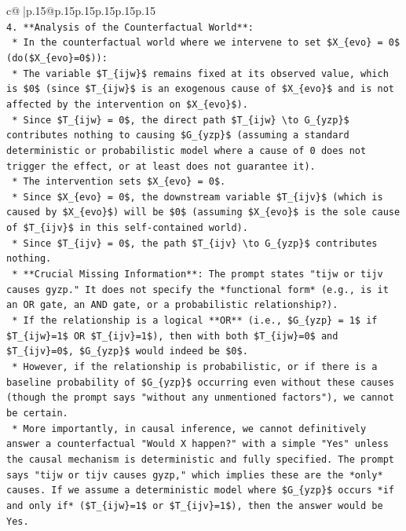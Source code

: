\documentclass{article}
\begin{document}
{\begin{supertabular}{c@{$\;$}|p{.15\linewidth}@{}p{.15\linewidth}p{.15\linewidth}p{.15\linewidth}p{.15\linewidth}p{.15\linewidth}}
{{{\\ 
\texttt{4.  **Analysis of the Counterfactual World**:} \\
\texttt{    *   In the counterfactual world where we intervene to set \$X\_\{evo\} = 0\$ (do(\$X\_\{evo\}=0\$)):} \\
\texttt{        *   The variable \$T\_\{ijw\}\$ remains fixed at its observed value, which is \$0\$ (since \$T\_\{ijw\}\$ is an exogenous cause of \$X\_\{evo\}\$ and is not affected by the intervention on \$X\_\{evo\}\$).} \\
\texttt{        *   Since \$T\_\{ijw\} = 0\$, the direct path \$T\_\{ijw\} \textbackslash{}to G\_\{yzp\}\$ contributes nothing to causing \$G\_\{yzp\}\$ (assuming a standard deterministic or probabilistic model where a cause of 0 does not trigger the effect, or at least does not guarantee it).} \\
\texttt{        *   The intervention sets \$X\_\{evo\} = 0\$.} \\
\texttt{        *   Since \$X\_\{evo\} = 0\$, the downstream variable \$T\_\{ijv\}\$ (which is caused by \$X\_\{evo\}\$) will be \$0\$ (assuming \$X\_\{evo\}\$ is the sole cause of \$T\_\{ijv\}\$ in this self{-}contained world).} \\
\texttt{        *   Since \$T\_\{ijv\} = 0\$, the path \$T\_\{ijv\} \textbackslash{}to G\_\{yzp\}\$ contributes nothing.} \\
\texttt{    *   **Crucial Missing Information**: The prompt states "tijw or tijv causes gyzp." It does not specify the *functional form* (e.g., is it an OR gate, an AND gate, or a probabilistic relationship?).} \\
\texttt{        *   If the relationship is a logical **OR** (i.e., \$G\_\{yzp\} = 1\$ if \$T\_\{ijw\}=1\$ OR \$T\_\{ijv\}=1\$), then with both \$T\_\{ijw\}=0\$ and \$T\_\{ijv\}=0\$, \$G\_\{yzp\}\$ would indeed be \$0\$.} \\
\texttt{        *   However, if the relationship is probabilistic, or if there is a baseline probability of \$G\_\{yzp\}\$ occurring even without these causes (though the prompt says "without any unmentioned factors"), we cannot be certain.} \\
\texttt{        *   More importantly, in causal inference, we cannot definitively answer a counterfactual "Would X happen?" with a simple "Yes" unless the causal mechanism is deterministic and fully specified. The prompt says "tijw or tijv causes gyzp," which implies these are the *only* causes. If we assume a deterministic model where \$G\_\{yzp\}\$ occurs *if and only if* (\$T\_\{ijw\}=1\$ or \$T\_\{ijv\}=1\$), then the answer would be Yes.} \\
}}}
\end{supertabular}}
\end{document}
